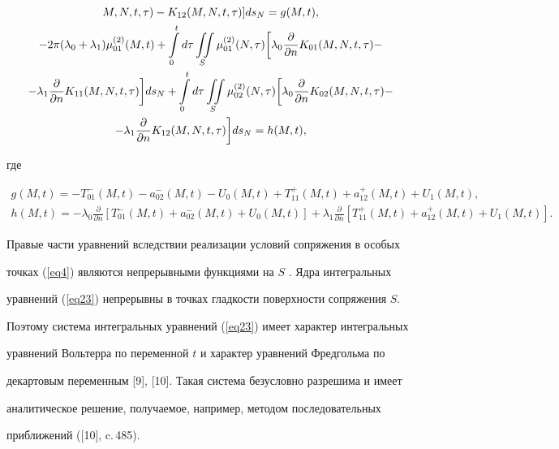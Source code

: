 \begin{pf}
\begin{gather}
{{M,N,t,\tau})-K_{12} ({M,N,t,\tau})}]ds_{N}=g ({M,t}),\notag \\


%


-2\pi (\lambda_0+\lambda_1)\mu_{01}^{(2)}


(M,t)+\int\limits_0^t d\tau 


\iint\limits_S \mu_{01}^{(2)} (N,\tau)


\bigg[\lambda_0 \frac{\partial}{\partial n}K_{01}({M,N,t,\tau})-\notag \\


%


-\lambda_1 \frac{\partial}{\partial n}K_{11} (M,N,t,\tau)\bigg]ds_N+


\int\limits_0^t d\tau \iint\limits_S \mu_{02}^{(2)}


(N,\tau) \bigg[\lambda_0 \frac{\partial}{\partial n}K_{02}


(M,N,t,\tau)-\notag \\


%


\label{eq23}


-\lambda_1 \frac{\partial}{\partial n}K_{12}


(M,N,t,\tau )\bigg]ds_N=h (M,t),


\end{gather}


где


\begin{gather*}


g ({M,t})=- T_{01}^{-} ({M,t})-a_{02}^{-} ({M,t})-U_{0} ({M,t})+


T_{11}^{+} ({M,t})+a_{12}^{+} ({M,t})+U_{1} ({M,t} ), \\


%


h ({M,t})=- \lambda_{0} \frac{{\partial}}{{\partial 


n}} [{T_{01}^{-} ({M,t})+a_{02}^{-} ({M,t} 


)+U_{0} ({M,t})}]+


\lambda_{1} \frac{{\partial}}{{\partial n}} [{T_{11}^{+} (


{M,t})+a_{12}^{+} ({M,t})+U_1 ({M,t})} ].


\end{gather*}


Правые части уравнений вследствии реализации условий сопряжения в особых 


точках (\ref{eq4}) являются непрерывными функциями на $S$ . Ядра интегральных 


уравнений (\ref{eq23}) непрерывны в точках гладкости поверхности сопряжения $S$. 


Поэтому система интегральных уравнений (\ref{eq23}) имеет характер интегральных 


уравнений Вольтерра по переменной $t$ и характер уравнений Фредгольма по 


декартовым переменным [9], [10]. Такая система безусловно разрешима и имеет 


аналитическое решение, получаемое, например, методом последовательных 


приближений ([10], c.\,485).


\end{pf}
